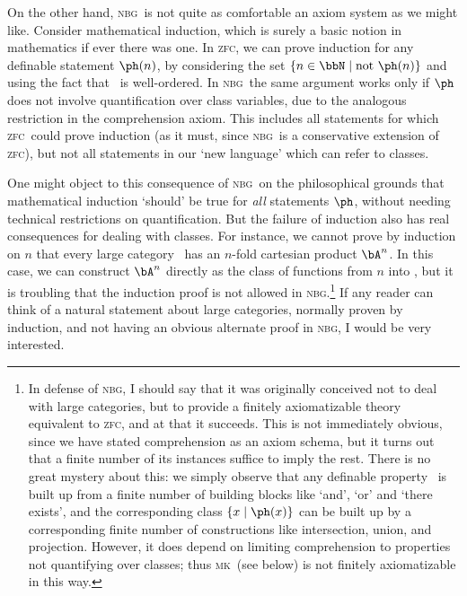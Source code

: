 \documentclass{amsart}
\def\zfc{\textsc{zfc}}
\def\nbg{\textsc{nbg}}
\def\mk{\textsc{mk}}
\begin{document}
On the other hand, \nbg\ is not quite as comfortable an axiom system as
we might like.  Consider mathematical induction, which is surely a
basic notion in mathematics if ever there was one.  In \zfc, we can
prove induction for any definable statement $\ph(n)$, by considering
the set $\{n \in\bbN \mid \text{not } \ph(n)\}$ and using the fact
that \bbN\ is well-ordered.  In \nbg\ the same argument works only if
$\ph$ does not involve quantification over class variables, due to the
analogous restriction in the comprehension axiom.  This includes all
statements for which \zfc\ could prove induction (as it must, since \nbg\
is a conservative extension of \zfc), but not all statements in our
`new language' which can refer to classes.

One might object to this consequence of \nbg\ on the philosophical
grounds that mathematical induction `should' be true for \emph{all}
statements $\ph$, without needing technical restrictions on
quantification.  But the failure of induction also has real
consequences for dealing with classes.  For instance, we cannot prove
by induction on $n$ that every large category \bA\ has an $n$-fold
cartesian product $\bA^n$.  In this case, we can construct $\bA^n$
directly as the class of functions from $n$ into \bA, but it is
troubling that the induction proof is not allowed in \nbg.\footnote{In
  defense of \nbg, I should say that it was originally conceived not
  to deal with large categories, but to provide a finitely
  axiomatizable theory equivalent to \zfc, and at that it succeeds.
  This is not immediately obvious, since we have stated comprehension
  as an axiom schema, but it turns out that a finite number of its
  instances suffice to imply the rest.  There is no great mystery
  about this: we simply observe that any definable property \ph\ is
  built up from a finite number of building blocks like `and', `or'
  and `there exists', and the corresponding class $\{x\mid \ph(x)\}$
  can be built up by a corresponding finite number of constructions
  like intersection, union, and projection.  However, it does depend
  on limiting comprehension to properties not quantifying over
  classes; thus \mk\ (see below) is not finitely axiomatizable in this
  way.}  If any reader can think of a natural statement about large
categories, normally proven by induction, and not having an obvious
alternate proof in \nbg, I would be very interested.
\end{document}
